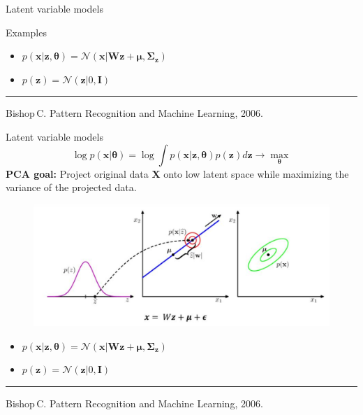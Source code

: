 \documentclass{beamer}
\newcommand{\bx}{\mathbf{x}}
\newcommand{\bz}{\mathbf{z}}
\newcommand{\bX}{\mathbf{X}}
\newcommand{\btheta}{\boldsymbol{\theta}}
\begin{document}
\begin{frame}{Latent variable models}
\begin{block}{Examples}
\begin{minipage}[t]{0.53\columnwidth}
\begin{figure}
		\end{figure}
		\vspace{-0.5cm}
		\begin{itemize}
	        \item $p(\bx | \bz, \btheta) = \mathcal{N}(\bx | \mathbf{W} \bz + \boldsymbol{\mu}, \boldsymbol{\Sigma}_\bz)$
	        \item $p(\bz) = \mathcal{N}(\bz | 0, \mathbf{I})$
	    \end{itemize}
	\end{minipage}
	\end{block}

\vfill
\hrule\medskip
{\scriptsize Bishop\,C. Pattern Recognition and Machine Learning, 2006.}
    
\end{frame}
\begin{frame}{Latent variable models}
    \[
    \log p(\bx | \btheta) = \log \int p(\bx | \bz, \btheta) p(\bz) d\bz \rightarrow \max_{\btheta}
    \]
	\textbf{PCA goal:} Project original data $\bX$ onto low latent space while maximizing the variance of the projected data. 
	\begin{figure}
		\centering
		\includegraphics[width=.7\linewidth]{figs/bayesian_pca.png}
	\end{figure}
	\vspace{-0.5cm}
	\begin{itemize}
        \item $p(\bx | \bz, \btheta) = \mathcal{N}(\bx | \mathbf{W} \bz + \boldsymbol{\mu}, \boldsymbol{\Sigma}_\bz)$
        \item $p(\bz) = \mathcal{N}(\bz | 0, \mathbf{I})$
    \end{itemize}

\vfill
\hrule\medskip
{\scriptsize Bishop\,C. Pattern Recognition and Machine Learning, 2006.}
    
\end{frame}
\end{document}
